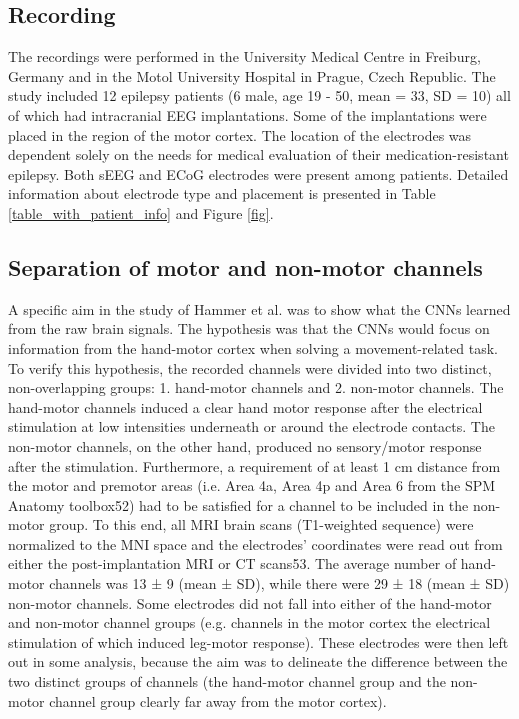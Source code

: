 \subsection{Recording}\label{subsec:recording}
The recordings were performed in the University Medical Centre in Freiburg, Germany and in the Motol University Hospital in Prague, Czech Republic.
The study included 12 epilepsy patients (6 male, age 19 - 50, mean = 33, SD = 10) all of which had intracranial EEG implantations.
Some of the implantations were placed in the region of the motor cortex.
The location of the electrodes was dependent solely on the needs for medical evaluation of their medication-resistant epilepsy.
Both sEEG and ECoG electrodes were present among patients.
Detailed information about electrode type and placement is presented in Table \ref{table_with_patient_info} and Figure \ref{fig}.

\subsection{Separation of motor and non-motor channels}\label{subsec:separation-of-motor-and-non-motor-channels}
A specific aim in the study of Hammer et al. was to show what the CNNs learned from the raw brain signals.
The hypothesis was that the CNNs would focus on information from the hand-motor cortex when solving a movement-related task.
To verify this hypothesis, the recorded channels were divided into two distinct, non-overlapping groups: 1. hand-motor channels and 2. non-motor channels.
The hand-motor channels induced a clear hand motor response after the electrical stimulation at low intensities underneath or around the electrode contacts.
The non-motor channels, on the other hand, produced no sensory/motor response after the stimulation.
Furthermore, a requirement of at least 1 cm distance from the motor and premotor areas (i.e. Area 4a, Area 4p and Area 6 from the SPM Anatomy toolbox52) had to be satisfied for a channel to be included in the non-motor group.
To this end, all MRI brain scans (T1-weighted sequence) were normalized to the MNI space and the electrodes' coordinates were read out from either the post-implantation MRI or CT scans53.
The average number of hand-motor channels was 13 ± 9 (mean ± SD), while there were 29 ± 18 (mean ± SD) non-motor channels.
Some electrodes did not fall into either of the hand-motor and non-motor channel groups (e.g. channels in the motor cortex the electrical stimulation of which induced leg-motor response).
These electrodes were then left out in some analysis, because the aim was to delineate the difference between the two distinct groups of channels (the hand-motor channel group and the non-motor channel group clearly far away from the motor cortex).



